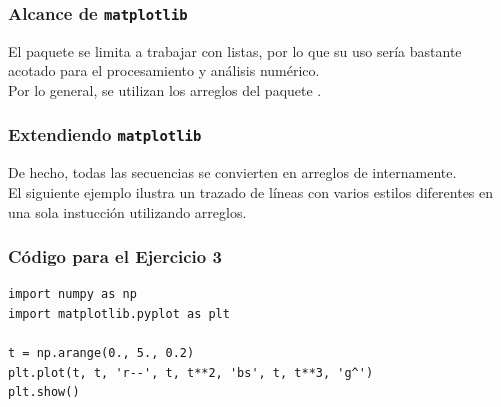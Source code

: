\begin{frame}
\frametitle{Alcance de \texttt{matplotlib}}
El paquete  se limita a trabajar con listas, por lo que su uso sería bastante acotado para el procesamiento y análisis numérico.
\\
\medskip
Por lo general, se utilizan los arreglos del paquete .
\end{frame}
\begin{frame}
\frametitle{Extendiendo \texttt{matplotlib}}
De hecho, todas las secuencias se convierten en arreglos de  internamente.
\\
\medskip
El siguiente ejemplo ilustra un trazado de líneas con varios estilos diferentes en una sola instucción utilizando arreglos.
\end{frame}
\begin{frame}[fragile]
\frametitle{Código para el Ejercicio 3}
\begin{lstlisting}[style=codigopython]
import numpy as np
import matplotlib.pyplot as plt

t = np.arange(0., 5., 0.2)
plt.plot(t, t, 'r--', t, t**2, 'bs', t, t**3, 'g^')
plt.show()
\end{lstlisting}
\end{frame}
